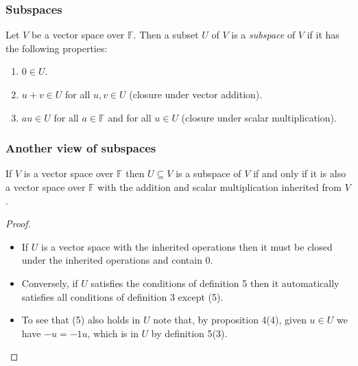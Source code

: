 \documentclass[handout]{beamer}
\newcommand{\bF}{\mathbb{F}}
\begin{document}
\begin{frame}
\frametitle{Subspaces}
\begin{definition}
Let $V$ be a vector space over $\bF$. Then a subset $U$ of $V$ is a \emph{subspace} of $V$ if it has the following properties:
\begin{enumerate}
\item $0\in U$.
\item $u + v \in U$ for all $u,v\in U$ (closure under vector addition). 
\item $au\in U$ for all $a\in \bF$ and for all $u\in U$ (closure under scalar multiplication).
\end{enumerate}
\end{definition}
\end{frame}

\begin{frame}
\frametitle{Another view of subspaces}
\begin{lemma}
If $V$ is a vector space over $\bF$ then $U\subseteq V$ is a subspace of $V$ if and only if it is also a vector space over $\bF$ with the addition and scalar multiplication inherited from $V$.
\end{lemma}
\begin{proof}
\begin{itemize}
\item If $U$ is a vector space with the inherited operations then it must be closed under the inherited operations and contain $0$. 
\item Conversely, if $U$ satisfies the conditions of definition 5 then it automatically satisfies all conditions of definition 3 except (5). 
\item To see that (5) also holds in $U$ note that, by proposition 4(4), given $u\in U$ we have $-u = -1u$, which is in $U$ by definition 5(3).
\end{itemize}
\end{proof}
\end{frame}
\end{document}
